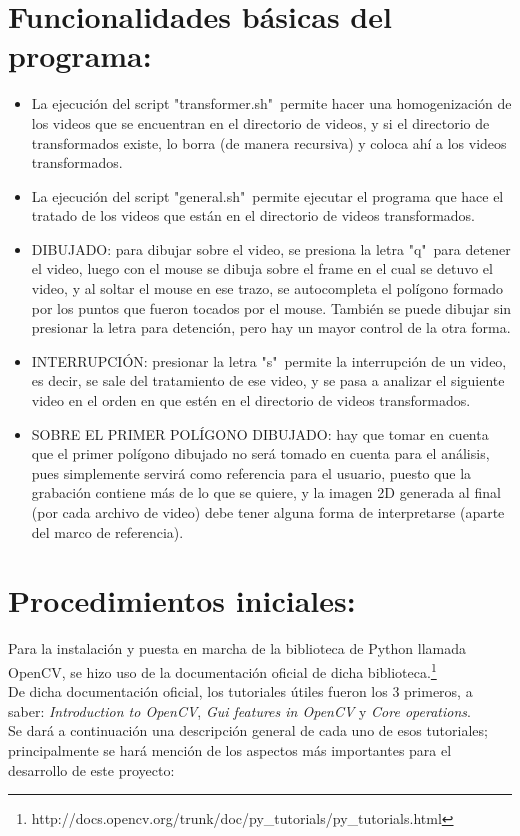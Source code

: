 \documentclass[letter]{article}
\begin{document}
\section{\normalsize Funcionalidades básicas del programa:}
\begin{itemize}
\item La ejecución del script "transformer.sh"\ permite hacer una homogenización de los videos que se encuentran en el directorio de videos, y si el directorio de transformados existe, lo borra (de manera recursiva) y coloca ahí a los videos transformados.
\item La ejecución del script "general.sh"\ permite ejecutar el programa que hace el tratado de los videos que están en el directorio de videos transformados.
\item DIBUJADO: para dibujar sobre el video, se presiona la letra "q"\ para detener el video, luego con el mouse se dibuja sobre el frame en el cual se detuvo el video, y al soltar el mouse en ese trazo, se autocompleta el polígono formado por los puntos que fueron tocados por el mouse. También se puede dibujar sin presionar la letra para detención, pero hay un mayor control de la otra forma.
\item INTERRUPCIÓN: presionar la letra "s"\ permite la interrupción de un video, es decir, se sale del tratamiento de ese video, y se pasa a analizar el siguiente video en el orden en que estén en el directorio de videos transformados.
\item SOBRE EL PRIMER POLÍGONO DIBUJADO: hay que tomar en cuenta que el primer polígono dibujado no será tomado en cuenta para el análisis, pues simplemente servirá como referencia para el usuario, puesto que la grabación contiene más de lo que se quiere, y la imagen 2D generada al final (por cada archivo de video) debe tener alguna forma de interpretarse (aparte del marco de referencia).
\end{itemize}


\section{\normalsize Procedimientos iniciales:}
Para la instalación y puesta en marcha de la biblioteca de Python llamada OpenCV, se hizo uso de la documentación oficial de dicha biblioteca.\footnote{http://docs.opencv.org/trunk/doc/py\_tutorials/py\_tutorials.html}\\
De dicha documentación oficial, los tutoriales útiles fueron los 3 primeros, a saber: \textit{Introduction to OpenCV}, \textit{Gui features in OpenCV} y \textit{Core operations}.\\
Se dará a continuación una descripción general de cada uno de esos tutoriales; principalmente se hará mención de los aspectos más importantes para el desarrollo de este proyecto:
\end{document}
